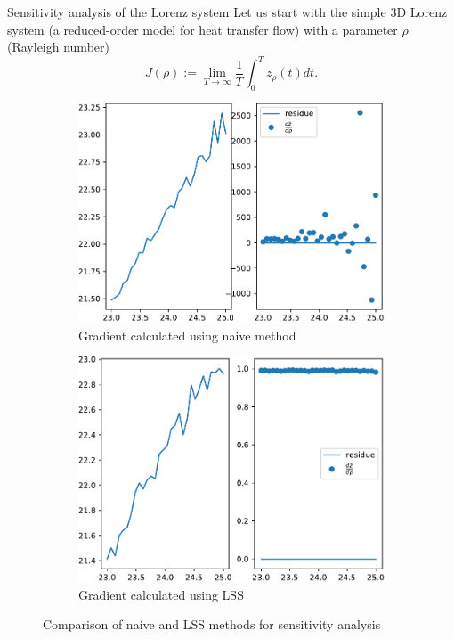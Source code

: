 \documentclass[NUS-Kajima workshop]{beamer}
\begin{document}
\begin{frame}{Sensitivity analysis of the Lorenz system}
	Let us start with the simple 3D Lorenz system (a reduced-order model for heat transfer flow) with a parameter $\rho$ (Rayleigh number)
	\begin{equation}
		J(\rho) := \lim_{T\rightarrow \infty} \frac{1}{T}\int_0^T z_{\rho}(t)dt.
	\end{equation} 
	\begin{figure}[ht]
			\centering
			\begin{subfigure}{0.5\linewidth} %
				\centering
				\includegraphics[width=\linewidth]{fig/Lorenz1.pdf}
				\caption{Gradient calculated using naive method}
			  \end{subfigure}%
			  \begin{subfigure}{0.5\linewidth} %
				\centering
				\includegraphics[width=\linewidth]{fig/Lorenz2.pdf}
				\caption{Gradient calculated using LSS}
			  \end{subfigure}
			  \caption{Comparison of naive and LSS methods for sensitivity analysis}
	\end{figure}
\end{frame}
\end{document}

